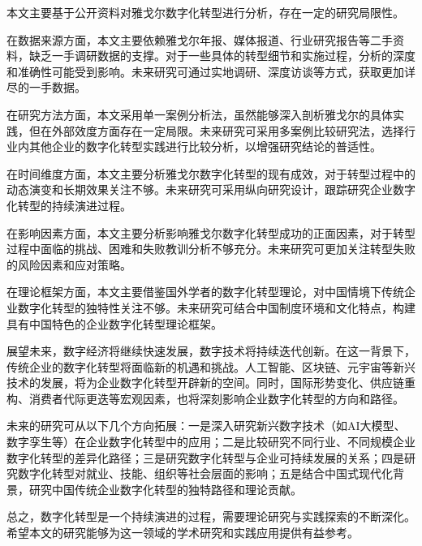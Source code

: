 \documentclass[12pt,a4paper]{article}
\begin{document}
本文主要基于公开资料对雅戈尔数字化转型进行分析，存在一定的研究局限性。

在数据来源方面，本文主要依赖雅戈尔年报、媒体报道、行业研究报告等二手资料，缺乏一手调研数据的支撑。对于一些具体的转型细节和实施过程，分析的深度和准确性可能受到影响。未来研究可通过实地调研、深度访谈等方式，获取更加详尽的一手数据。

在研究方法方面，本文采用单一案例分析法，虽然能够深入剖析雅戈尔的具体实践，但在外部效度方面存在一定局限。未来研究可采用多案例比较研究法，选择行业内其他企业的数字化转型实践进行比较分析，以增强研究结论的普适性。

在时间维度方面，本文主要分析雅戈尔数字化转型的现有成效，对于转型过程中的动态演变和长期效果关注不够。未来研究可采用纵向研究设计，跟踪研究企业数字化转型的持续演进过程。

在影响因素方面，本文主要分析影响雅戈尔数字化转型成功的正面因素，对于转型过程中面临的挑战、困难和失败教训分析不够充分。未来研究可更加关注转型失败的风险因素和应对策略。

在理论框架方面，本文主要借鉴国外学者的数字化转型理论，对中国情境下传统企业数字化转型的独特性关注不够。未来研究可结合中国制度环境和文化特点，构建具有中国特色的企业数字化转型理论框架。

展望未来，数字经济将继续快速发展，数字技术将持续迭代创新。在这一背景下，传统企业的数字化转型将面临新的机遇和挑战。人工智能、区块链、元宇宙等新兴技术的发展，将为企业数字化转型开辟新的空间。同时，国际形势变化、供应链重构、消费者代际更迭等宏观因素，也将深刻影响企业数字化转型的方向和路径。

未来的研究可从以下几个方向拓展：一是深入研究新兴数字技术（如AI大模型、数字孪生等）在企业数字化转型中的应用；二是比较研究不同行业、不同规模企业数字化转型的差异化路径；三是研究数字化转型与企业可持续发展的关系；四是研究数字化转型对就业、技能、组织等社会层面的影响；五是结合中国式现代化背景，研究中国传统企业数字化转型的独特路径和理论贡献。

总之，数字化转型是一个持续演进的过程，需要理论研究与实践探索的不断深化。希望本文的研究能够为这一领域的学术研究和实践应用提供有益参考。

\newpage
\end{document}
